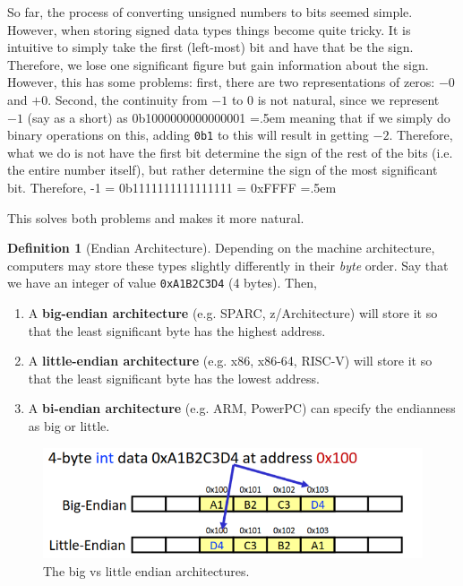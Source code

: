 \documentclass{article}
\theoremstyle{definition}
\newtheorem{definition}{Definition}[section]
\newenvironment{cverbatim}
   {\SaveVerbatim{cverb}}
   {\endSaveVerbatim
    \flushleft\fboxrule=0pt\fboxsep=.5em
    \colorbox{cverbbg}{%
      \makebox[\dimexpr\linewidth-2\fboxsep][l]{\BUseVerbatim{cverb}}%
    }
    \endflushleft
  }
\begin{document}
    So far, the process of converting unsigned numbers to bits seemed simple. However, when storing signed data types things become quite tricky. It is intuitive to simply take the first (left-most) bit and have that be the sign. Therefore, we lose one significant figure but gain information about the sign. However, this has some problems: first, there are two representations of zeros: $-0$ and $+0$. Second, the continuity from $-1$ to $0$ is not natural, since we represent $-1$ (say as a short) as 
    \begin{cverbatim} 
      0b1000000000000001
    \end{cverbatim}
    meaning that if we simply do binary operations on this, adding \texttt{0b1} to this will result in getting $-2$. Therefore, what we do is not have the first bit determine the sign of the rest of the bits (i.e. the entire number itself), but rather determine the sign of the most significant bit. Therefore, 
    \begin{cverbatim} 
      -1 = 0b1111111111111111 = 0xFFFF
    \end{cverbatim}

    This solves both problems and makes it more natural. 


    \begin{definition}[Endian Architecture]
      Depending on the machine architecture, computers may store these types slightly differently in their \textit{byte} order. Say that we have an integer of value \texttt{0xA1B2C3D4} (4 bytes). Then, 
      \begin{enumerate} 
        \item A \textbf{big-endian architecture} (e.g. SPARC, z/Architecture) will store it so that the least significant byte has the highest address.
        \item A \textbf{little-endian architecture} (e.g. x86, x86-64, RISC-V) will store it so that the least significant byte has the lowest address. 
        \item A \textbf{bi-endian architecture} (e.g. ARM, PowerPC) can specify the endianness as big or little. 
      \end{enumerate}

      \begin{figure}[hbt!]
        \centering 
        \includegraphics[scale=0.4]{img/endianness.png}
        \caption{The big vs little endian architectures. } 
        \label{fig:endianness}
      \end{figure}
    \end{definition}
\end{document}
